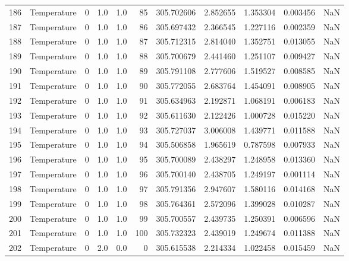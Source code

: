\begin{tabular}{llrrrrrrrrr}
186 &  Temperature &       0 &  1.0 &  1.0 &   85 &  305.702606 &  2.852655 &  1.353304 &   0.003456 &      NaN \\
187 &  Temperature &       0 &  1.0 &  1.0 &   86 &  305.697432 &  2.366545 &  1.227116 &   0.002359 &      NaN \\
188 &  Temperature &       0 &  1.0 &  1.0 &   87 &  305.712315 &  2.814040 &  1.352751 &   0.013055 &      NaN \\
189 &  Temperature &       0 &  1.0 &  1.0 &   88 &  305.700679 &  2.441460 &  1.251107 &   0.009427 &      NaN \\
190 &  Temperature &       0 &  1.0 &  1.0 &   89 &  305.791108 &  2.777606 &  1.519527 &   0.008585 &      NaN \\
191 &  Temperature &       0 &  1.0 &  1.0 &   90 &  305.772055 &  2.683764 &  1.454091 &   0.008905 &      NaN \\
192 &  Temperature &       0 &  1.0 &  1.0 &   91 &  305.634963 &  2.192871 &  1.068191 &   0.006183 &      NaN \\
193 &  Temperature &       0 &  1.0 &  1.0 &   92 &  305.611630 &  2.122426 &  1.000728 &   0.015220 &      NaN \\
194 &  Temperature &       0 &  1.0 &  1.0 &   93 &  305.727037 &  3.006008 &  1.439771 &   0.011588 &      NaN \\
195 &  Temperature &       0 &  1.0 &  1.0 &   94 &  305.506858 &  1.965619 &  0.787598 &   0.007933 &      NaN \\
196 &  Temperature &       0 &  1.0 &  1.0 &   95 &  305.700089 &  2.438297 &  1.248958 &   0.013360 &      NaN \\
197 &  Temperature &       0 &  1.0 &  1.0 &   96 &  305.700140 &  2.438705 &  1.249197 &   0.001114 &      NaN \\
198 &  Temperature &       0 &  1.0 &  1.0 &   97 &  305.791356 &  2.947607 &  1.580116 &   0.014168 &      NaN \\
199 &  Temperature &       0 &  1.0 &  1.0 &   98 &  305.764361 &  2.572096 &  1.399028 &   0.010287 &      NaN \\
200 &  Temperature &       0 &  1.0 &  1.0 &   99 &  305.700557 &  2.439735 &  1.250391 &   0.006596 &      NaN \\
201 &  Temperature &       0 &  1.0 &  1.0 &  100 &  305.732323 &  2.439019 &  1.249674 &   0.011388 &      NaN \\
202 &  Temperature &       0 &  2.0 &  0.0 &    0 &  305.615538 &  2.214334 &  1.022458 &   0.015459 &      NaN \\

\end{tabular}
